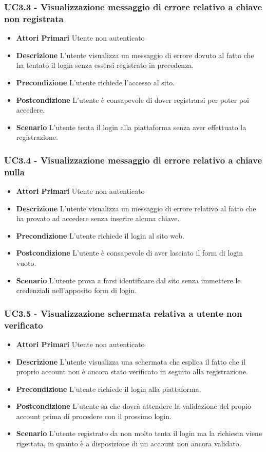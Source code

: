 \subsubsection{UC3.3 - Visualizzazione messaggio di errore relativo a chiave non registrata}
\begin{itemize}
	\item \textbf{Attori Primari}
	Utente non autenticato
	\item \textbf{Descrizione}
	L'utente visualizza un messaggio di errore dovuto al fatto che ha tentato il login senza essersi registrato in precedenza.
	\item \textbf{Precondizione}
	L'utente richiede l'accesso al sito.
	\item \textbf{Postcondizione}
	L'utente è consapevole di dover registrarsi per poter poi accedere.
	\item \textbf{Scenario}
	L'utente tenta il login alla piattaforma senza aver effettuato la registrazione.
\end{itemize}
\subsubsection{UC3.4 - Visualizzazione messaggio di errore relativo a chiave nulla}
\begin{itemize}
	\item \textbf{Attori Primari}
	Utente non autenticato
	\item \textbf{Descrizione}
	L'utente visualizza un messaggio di errore relativo al fatto che ha provato ad accedere senza inserire alcuna chiave.
	\item \textbf{Precondizione}
	L'utente richiede il login al sito web.
	\item \textbf{Postcondizione}
	L'utente è consapevole di aver lasciato il form di login vuoto.
	\item \textbf{Scenario}
	L'utente prova a farsi identificare dal sito senza immettere le credenziali nell'apposito form di login.
\end{itemize}
\subsubsection{UC3.5 - Visualizzazione schermata relativa a utente non verificato}
\begin{itemize}
	\item \textbf{Attori Primari}
	Utente non autenticato
	\item \textbf{Descrizione}
	L'utente visualizza una schermata che esplica il fatto che il proprio account non è ancora stato verificato in seguito alla registrazione.
	\item \textbf{Precondizione}
	L'utente richiede il login alla piattaforma.
	\item \textbf{Postcondizione}
	L'utente sa che dovrà attendere la validazione del propio account prima di procedere con il prossimo login.
	\item \textbf{Scenario}
	L'utente registrato da non molto tenta il login ma la richiesta viene rigettata, in quanto è a disposizione di un account non ancora validato.
\end{itemize}
